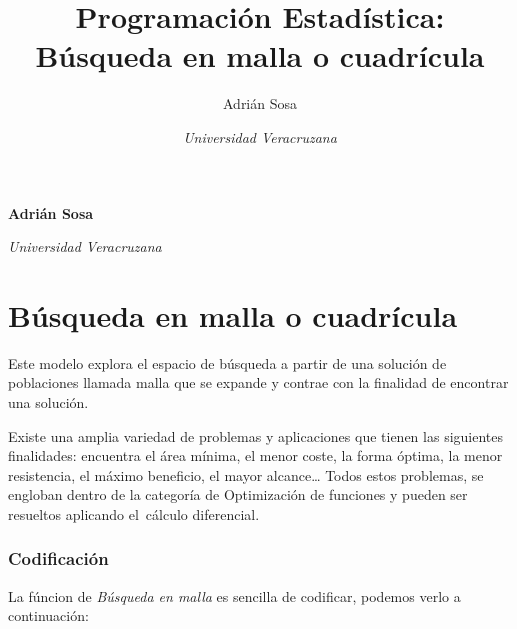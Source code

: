 \documentclass[11pt,]{article}
\title{Programación Estadística: Búsqueda en malla o cuadrícula  }
\author{\Large Adrián Sosa\vspace{0.05in} \newline\normalsize\emph{}   \and \Large \vspace{0.05in} \newline\normalsize\emph{Universidad Veracruzana}  }
\date{}
\newcommand*{\authorfont}{\fontfamily{phv}\selectfont}
\begin{document}
	
%

{%
\setlength{\parindent}{0pt}
\thispagestyle{plain}
{\fontsize{18}{20}\selectfont\raggedright 
\maketitle  %

}

{
   \vskip 13.5pt\relax \normalsize\fontsize{11}{12} 
\textbf{\authorfont Adrián Sosa} \hskip 15pt \emph{\small }   \par \textbf{\authorfont } \hskip 15pt \emph{\small Universidad Veracruzana}   
}

}






\vskip -8.5pt



\noindent  

\hypertarget{buxfasqueda-en-malla-o-cuadruxedcula}{%
\section{Búsqueda en malla o
cuadrícula}\label{buxfasqueda-en-malla-o-cuadruxedcula}}

Este modelo explora el espacio de búsqueda a partir de una solución de
poblaciones llamada malla que se expande y contrae con la finalidad de
encontrar una solución.

Existe una amplia variedad de problemas y aplicaciones que tienen las
siguientes finalidades: encuentra el área mínima, el menor coste, la
forma óptima, la menor resistencia, el máximo beneficio, el mayor
alcance\ldots{} Todos estos problemas, se engloban dentro de la
categoría de Optimización de funciones y pueden ser resueltos aplicando
el~cálculo diferencial.

\hypertarget{codificaciuxf3n}{%
\subsubsection{Codificación}\label{codificaciuxf3n}}

La fúncion de \emph{Búsqueda en malla} es sencilla de codificar, podemos
verlo a continuación:
\end{document}
